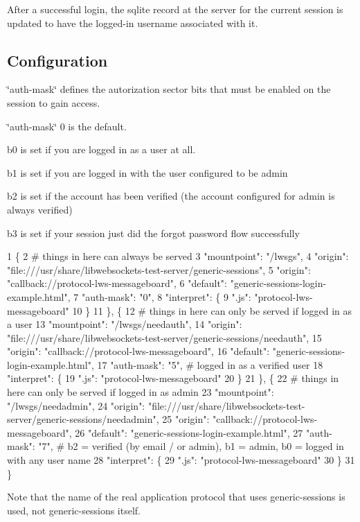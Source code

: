 After a successful login, the sqlite record at the server for the current session is updated to have the logged-\/in username associated with it.

\subsection*{Configuration }

\char`\"{}auth-\/mask\char`\"{} defines the autorization sector bits that must be enabled on the session to gain access.

\char`\"{}auth-\/mask\char`\"{} 0 is the default.


\begin{DoxyItemize}
\item b0 is set if you are logged in as a user at all.
\item b1 is set if you are logged in with the user configured to be admin
\item b2 is set if the account has been verified (the account configured for admin is always verified)
\item b3 is set if your session just did the forgot password flow successfully
\end{DoxyItemize}


\begin{DoxyCode}
1 \{
2   # things in here can always be served
3   "mountpoint": "/lwsgs",
4   "origin": "file:///usr/share/libwebsockets-test-server/generic-sessions",
5   "origin": "callback://protocol-lws-messageboard",
6   "default": "generic-sessions-login-example.html",
7   "auth-mask": "0",
8   "interpret": \{
9           ".js": "protocol-lws-messageboard"
10   \}
11  \}, \{
12   # things in here can only be served if logged in as a user
13   "mountpoint": "/lwsgs/needauth",
14   "origin": "file:///usr/share/libwebsockets-test-server/generic-sessions/needauth",
15   "origin": "callback://protocol-lws-messageboard",
16   "default": "generic-sessions-login-example.html",
17   "auth-mask": "5", # logged in as a verified user
18   "interpret": \{
19           ".js": "protocol-lws-messageboard"
20   \}
21  \}, \{
22   # things in here can only be served if logged in as admin
23   "mountpoint": "/lwsgs/needadmin",
24   "origin": "file:///usr/share/libwebsockets-test-server/generic-sessions/needadmin",
25   "origin": "callback://protocol-lws-messageboard",
26   "default": "generic-sessions-login-example.html",
27   "auth-mask": "7", # b2 = verified (by email / or admin), b1 = admin, b0 = logged in with any user name
28   "interpret": \{
29           ".js": "protocol-lws-messageboard"
30   \}
31  \}
\end{DoxyCode}
 Note that the name of the real application protocol that uses generic-\/sessions is used, not generic-\/sessions itself.

